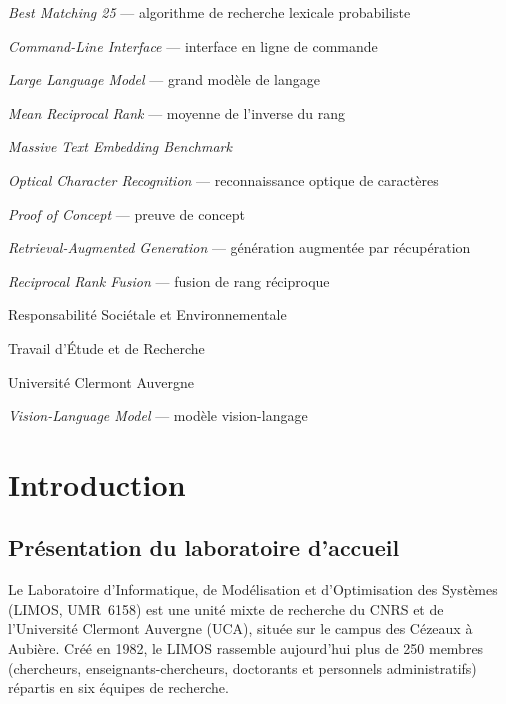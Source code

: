 \documentclass[11pt,a4paper]{article}
\begin{document}
\begin{description}[leftmargin=3.5cm,labelwidth=3cm]
  \item[BM25] \textit{Best Matching 25} --- algorithme de recherche lexicale probabiliste
  \item[CLI]  \textit{Command-Line Interface} --- interface en ligne de commande
  \item[LLM]  \textit{Large Language Model} --- grand modèle de langage
  \item[MRR]  \textit{Mean Reciprocal Rank} --- moyenne de l'inverse du rang
  \item[MTEB] \textit{Massive Text Embedding Benchmark}
  \item[OCR]  \textit{Optical Character Recognition} --- reconnaissance optique de caractères
  \item[POC]  \textit{Proof of Concept} --- preuve de concept
  \item[RAG]  \textit{Retrieval-Augmented Generation} --- génération augmentée par récupération
  \item[RRF]  \textit{Reciprocal Rank Fusion} --- fusion de rang réciproque
  \item[RSE]  Responsabilité Sociétale et Environnementale
  \item[TER]  Travail d'Étude et de Recherche
  \item[UCA]  Université Clermont Auvergne
  \item[VLM]  \textit{Vision-Language Model} --- modèle vision-langage
\end{description}

\newpage
\tableofcontents
\newpage
\listoffigures
\listoftables
\newpage

\section{Introduction}
\label{sec:introduction}

\subsection{Présentation du laboratoire d'accueil}
\label{sec:limos}

Le Laboratoire d'Informatique, de Modélisation et d'Optimisation des Systèmes (LIMOS, UMR~6158) est une unité mixte de recherche du CNRS et de l'Université Clermont Auvergne (UCA), située sur le campus des Cézeaux à Aubière. Créé en 1982, le LIMOS rassemble aujourd'hui plus de 250 membres (chercheurs, enseignants-chercheurs, doctorants et personnels administratifs) répartis en six équipes de recherche.
\end{document}
